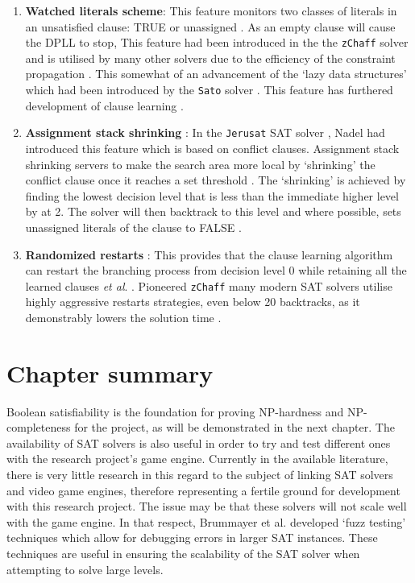 \documentclass[11pt, a4paper, oneside]{report} %
\begin{document}
\begin{enumerate}
  \item \textbf{Watched literals scheme}:  This feature monitors two classes of
literals in an unsatisfied clause: TRUE or unassigned \cite{moskewicz2001chaff}.
As an empty clause will cause the DPLL to stop, This feature had been introduced
in the the \texttt{zChaff} solver and is utilised by many other solvers due to
the efficiency of the constraint propagation \cite{gomes2008satisfiability}.
This somewhat of an advancement of the `lazy data structures' which had been
introduced by the \texttt{Sato} solver \cite{zhang1997sato}. This feature has
furthered development of clause learning
\cite{zhang2002quest,gomes2008satisfiability}.


  \item \textbf{Assignment stack shrinking} : In the \texttt{Jerusat} SAT solver
\cite{nadel2002jerusat}, Nadel had introduced this feature which is based on
conflict clauses. Assignment stack shrinking servers to make the search area
more local by `shrinking' the conflict clause once it reaches a set threshold
\cite{Nadel:2010:ASS:2164073.2164111}. The `shrinking' is achieved by finding
the lowest decision level that is less than the immediate higher level by at 2.
The solver will then backtrack to this level and where possible, sets unassigned
literals of the clause to FALSE \cite{Nadel:2010:ASS:2164073.2164111}.


  \item \textbf{Randomized restarts} : This provides that the clause learning
algorithm can restart   the branching process from decision level 0 while
retaining all the learned clauses \textit{et   al}. \cite{gomes1998boosting}.
Pioneered \texttt{zChaff} \cite{moskewicz2001chaff} many modern   SAT solvers
utilise highly aggressive restarts strategies, even below 20 backtracks, as it
demonstrably lowers the solution time \cite{gomes2008satisfiability}.

\end{enumerate}


\section{Chapter summary}

Boolean satisfiability is the foundation for proving NP-hardness and NP-
completeness for the project, as will be demonstrated in the next chapter. The
availability of SAT solvers is also useful in order to try and test different
ones with the research project's game engine. Currently in the available
literature, there is very little research in this regard to the subject of
linking SAT solvers and video game engines, therefore representing a fertile
ground for development with this research project. The issue may be that these
solvers will not scale well with the game engine. In that respect, Brummayer et
al. \cite{brummayer2010automated} developed `fuzz testing' techniques which
allow for debugging errors in larger SAT instances. These techniques are useful
in ensuring the scalability of the SAT solver when attempting to solve large
levels.
\end{document}

